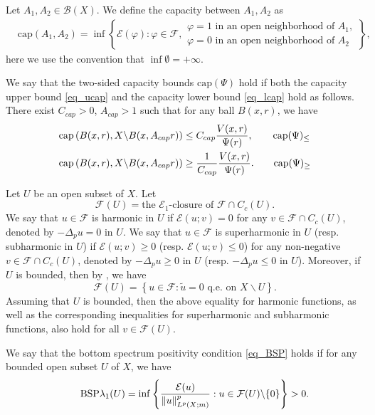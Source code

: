 \documentclass[10pt,a4paper]{amsart}
\numberwithin{equation}{section}
\begin{document}
Let $A_1,A_2\in\mathcal{B}(X)$. We define the capacity between $A_1,A_2$ as
\begin{align*}
&\mathrm{cap}(A_1,A_2)=\inf\left\{\mathcal{E}(\varphi):\varphi\in\mathcal{F},
\begin{array}{l}
\varphi=1\text{ in an open neighborhood of }A_1,\\
\varphi=0\text{ in an open neighborhood of }A_2
\end{array}
\right\},
\end{align*}
here we use the convention that $\inf\emptyset=+\infty$.

We say that the two-sided capacity bounds \hypertarget{eq_cap}{$\text{cap}(\Psi)$} hold if both the capacity upper bound \ref{eq_ucap} and the capacity lower bound \ref{eq_lcap} hold as follows. There exist $C_{cap}>0$, $A_{cap}>1$ such that for any ball $B(x,r)$, we have
\begin{align*}
\mathrm{cap}\left(B(x,r),X\backslash B(x,A_{cap}r)\right)&\le C_{cap} \frac{V(x,r)}{\Psi(r)},\label{eq_ucap}\tag*{$\text{cap}(\Psi)_{\le}$}\\
\mathrm{cap}\left(B(x,r),X\backslash B(x,A_{cap}r)\right)&\ge \frac{1}{C_{cap}} \frac{V(x,r)}{\Psi(r)}.\label{eq_lcap}\tag*{$\text{cap}(\Psi)_{\ge}$}
\end{align*}

Let $U$ be an open subset of $X$. Let
$$\mathcal{F}(U)=\text{the }\mathcal{E}_1\text{-closure of }\mathcal{F}\cap C_c(U).$$
We say that $u\in\mathcal{F}$ is harmonic in $U$ if $\mathcal{E}(u;v)=0$ for any $v\in\mathcal{F}\cap C_c(U)$, denoted by $-\Delta_pu=0$ in $U$. We say that $u\in\mathcal{F}$ is superharmonic in $U$ (resp. subharmonic in $U$) if $\mathcal{E}(u;v)\ge0$ (resp. $\mathcal{E}(u;v)\le0$) for any non-negative $v\in\mathcal{F}\cap C_c(U)$, denoted by $-\Delta_pu\ge0$ in $U$ (resp. $-\Delta_pu\le0$ in $U$). Moreover, if $U$ is bounded, then by \cite[Lemma 6.2]{Yan25c}, we have
$$\mathcal{F}(U)=\left\{u\in\mathcal{F}:\widetilde{u}=0\text{ q.e. on }X\backslash U\right\}.$$
Assuming that $U$ is bounded, then the above equality for harmonic functions, as well as the corresponding inequalities for superharmonic and subharmonic functions, also hold for all $v\in\mathcal{F}(U)$.

We say that the bottom spectrum positivity condition \ref{eq_BSP} holds if for any bounded open subset $U$ of $X$, we have
\begin{equation*}\label{eq_BSP}\tag*{\text{BSP}}
\lambda_1(U)=\inf \left\{\frac{\mathcal{E}(u)}{\lVert u\rVert_{L^p(X;m)}^p}:u\in \mathcal{F}(U)\backslash \{0\}\right\}>0.
\end{equation*}
\end{document}
